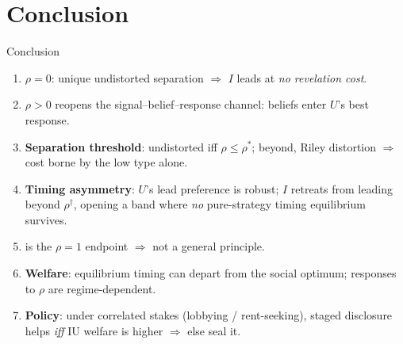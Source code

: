 \documentclass[aspectratio=169, 12pt]{beamer}
\newcommand{\rhosep}{\rho^{*}}
\newcommand{\rhodag}{\rho^{\dagger}}
\begin{document}
\section{Conclusion}

\begin{frame}{Conclusion}
  \small
  \begin{enumerate}
    \setlength{\itemsep}{0.45em}
    \item \textbf{$\rho = 0$}: unique undistorted separation $\Rightarrow$
      $I$ leads at \emph{no revelation cost}.
    \item \textbf{$\rho > 0$} reopens the signal--belief--response
      channel: beliefs enter $U$'s best response.
    \item \textbf{Separation threshold}: undistorted iff
      $\rho \le \rhosep$; beyond, Riley distortion $\Rightarrow$
      cost borne by the low type alone.
    \item \textbf{Timing asymmetry}: $U$'s lead preference is robust;
      $I$ retreats from leading beyond $\rhodag$, opening a band where
      \emph{no} pure-strategy timing equilibrium survives.
    \item \citet{fu2006} is the $\rho = 1$ endpoint $\Rightarrow$
      not a general principle.
    \item \textbf{Welfare}: equilibrium timing can depart from the social
      optimum; responses to $\rho$ are regime-dependent.
    \item \textbf{Policy}: under correlated stakes (lobbying / rent-seeking),
      staged disclosure helps \emph{iff} IU welfare is higher $\Rightarrow$ else seal it.
  \end{enumerate}
\end{frame}


\end{document}
